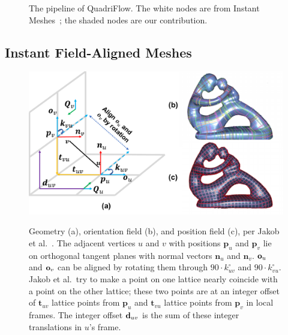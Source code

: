 \begin{figure}

\caption{The pipeline of QuadriFlow.  The white nodes are from Instant Meshes~\cite{jakob2015instant}; the shaded nodes are our contribution.}
\label{fig:quad-computations}
\end{figure}


\subsection{Instant Field-Aligned Meshes}
\label{sec:quad-instantmesh}


\begin{figure}
\centering
\includegraphics[width=0.6\linewidth]{quadriflow/diagram/instant.pdf}\\
\caption{Geometry (a), orientation field (b), and position field (c), per Jakob et al.~\cite{jakob2015instant}. The adjacent vertices $u$ and $v$ with positions $\mathbf{p}_u$ and $\mathbf{p}_v$ lie on orthogonal tangent planes with normal vectors $\mathbf{n}_u$ and $\mathbf{n}_v$. $\mathbf{o}_u$ and $\mathbf{o}_v$ can be aligned by rotating them through $90 \cdot k_{uv}^\circ$ and $90 \cdot k_{vu}^\circ$. Jakob et al.\ try to make a point on one lattice nearly coincide with a point on the other lattice; these two points are at an integer offset of $\mathbf{t}_{uv}$ lattice points from $\mathbf{p}_u$ and $\mathbf{t}_{vu}$ lattice points from $\mathbf{p}_v$ in local frames. The integer offset $\mathbf{d}_{uv}$ is the sum of these integer translations in $u$'s frame.}
\label{fig:quad-instant}
\end{figure}

